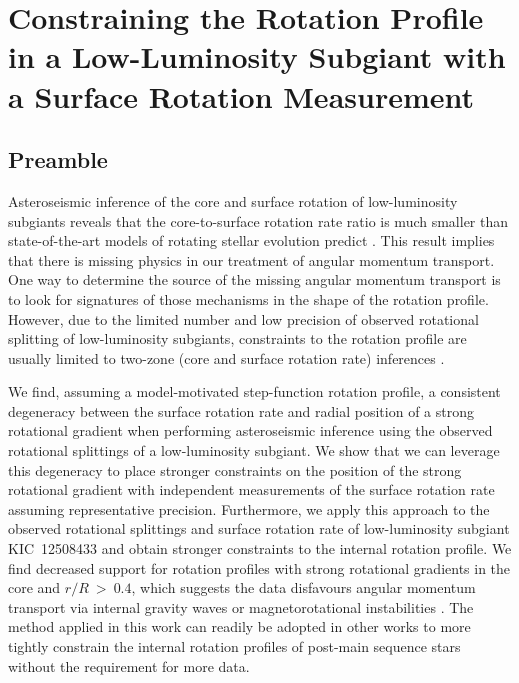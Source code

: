 
\newcommand\thestar{KIC~12508433}

\newcommand{\Revision}[1]{#1}
\newcommand{\TW}[1]{#1}

\newcommand{\Add}[1]{#1}

\chapter{Constraining the Rotation Profile in a Low-Luminosity Subgiant with a Surface Rotation Measurement}
\label{chap:subgiant_ast}

\section*{Preamble}

Asteroseismic inference of the core and surface rotation of low-luminosity subgiants reveals that the core-to-surface rotation rate ratio is much smaller than state-of-the-art models of rotating stellar evolution predict \citep{deheuvels_seismic_2014, cantiello_angular_2014, eggenberger_asteroseismology_2019}.
This result implies that there is missing physics in our treatment of angular momentum transport.
One way to determine the source of the missing angular momentum transport is to look for signatures of those mechanisms in the shape of the rotation profile.
However, due to the limited number and low precision of observed rotational splitting of low-luminosity subgiants, constraints to the rotation profile are usually limited to two-zone (core and surface rotation rate) inferences \citep{deheuvels_seismic_2014}.

We find, assuming a model-motivated step-function rotation profile, a consistent degeneracy between the surface rotation rate and radial position of a strong rotational gradient when performing asteroseismic inference using the observed rotational splittings of a low-luminosity subgiant.
We show that we can leverage this degeneracy to place stronger constraints on the position of the strong rotational gradient with independent measurements of the surface rotation rate assuming representative precision.
Furthermore, we apply this approach to the observed rotational splittings and surface rotation rate of low-luminosity subgiant KIC~12508433 and obtain stronger constraints to the internal rotation profile.
We find decreased support for rotation profiles with strong rotational gradients in the core and $r/R\ > \ 0.4$, which suggests the data disfavours angular momentum transport via internal gravity waves \citep[e.g.,][]{pincon_can_2017} or magnetorotational instabilities \citep[e.g.,][]{spada_angular_2016,menou_magnetorotational_2006}.
The method applied in this work can readily be adopted in other works to more tightly constrain the internal rotation profiles of post-main sequence stars without the requirement for more data.

